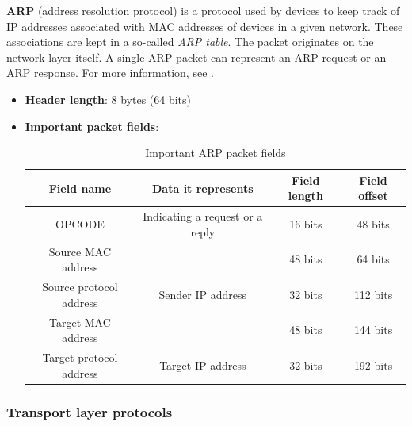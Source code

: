 \documentclass[a4paper]{article}
\begin{document}
  \vspace{1cm}


  \textbf{ARP} (address resolution protocol) is a protocol used by devices to 
  keep track of IP addresses associated with MAC addresses of devices in a 
  given network. These associations are kept in a so-called \textit{ARP table}.
  The packet originates on the network layer itself. A single ARP packet can 
  represent an ARP request or an ARP response.
  For more information, see \cite{wikipedia:arp}.

  \begin{itemize}
    \item \textbf{Header length}: 8 bytes (64 bits)
    \item \textbf{Important packet fields}:
      \begin{table}[h]
        \centering
        \begin{tabular}{|c|c|c|c|}
          \hline
          Field name & Data it represents & Field length & Field offset \\
          \hline
          \hline
          OPCODE & Indicating a request or a reply & 16 bits & 48 bits \\
          \hline
          Source MAC address & & 48 bits & 64 bits \\
          \hline
          Source protocol address & Sender IP address & 32 bits & 112 bits \\
          \hline
          Target MAC address & & 48 bits & 144 bits \\
          \hline
          Target protocol address & Target IP address & 32 bits & 192 bits \\
          \hline
        \end{tabular}
        \caption{Important ARP packet fields}
      \end{table}
  \end{itemize}

  \vspace{1cm}


  \subsubsection{Transport layer protocols}
\end{document}

